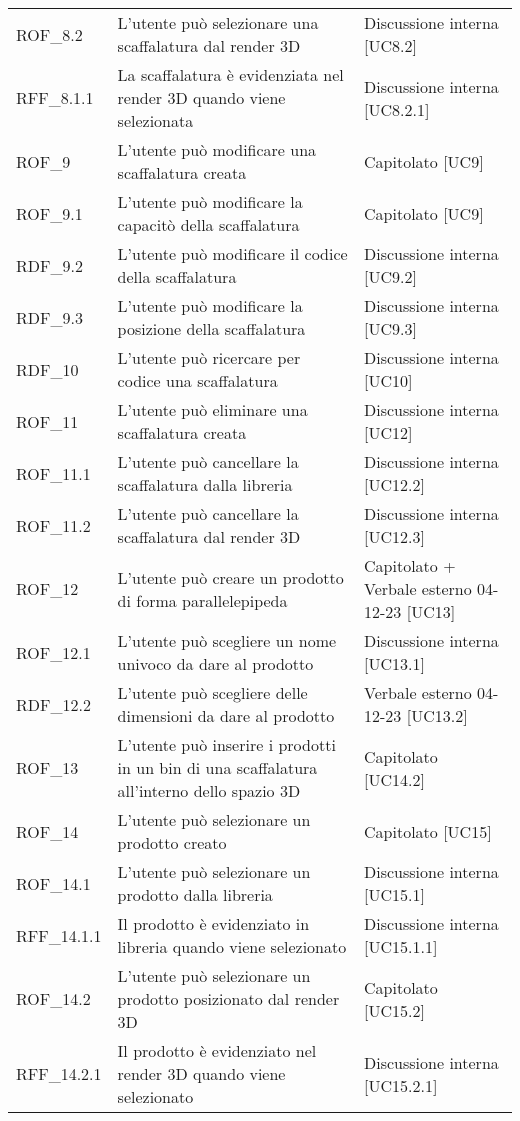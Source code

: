\begin{xltabular}{\textwidth}{ p{0.2\textwidth} | X | p{0.2\textwidth} }
    ROF\_8.2& L'utente può selezionare una scaffalatura dal render 3D & Discussione interna [UC8.2]\\
    RFF\_8.1.1& La scaffalatura è evidenziata nel render 3D quando viene selezionata & Discussione interna [UC8.2.1]\\
    ROF\_9& L'utente può modificare una scaffalatura creata & Capitolato [UC9]\\
    ROF\_9.1& L'utente può modificare la capacitò della scaffalatura & Capitolato [UC9]\\
    RDF\_9.2& L'utente può modificare il codice della scaffalatura & Discussione interna [UC9.2]\\
    RDF\_9.3& L'utente può modificare la posizione della scaffalatura & Discussione interna [UC9.3]\\
    RDF\_10& L'utente può ricercare per codice una scaffalatura & Discussione interna [UC10]\\
    ROF\_11& L'utente può eliminare una scaffalatura creata & Discussione interna [UC12]\\
    ROF\_11.1& L'utente può cancellare la scaffalatura dalla libreria & Discussione interna [UC12.2]\\
    ROF\_11.2& L'utente può cancellare la scaffalatura dal render 3D & Discussione interna [UC12.3]\\
    ROF\_12& L'utente può creare un prodotto di forma parallelepipeda & Capitolato + Verbale esterno 04-12-23 [UC13]\\
    ROF\_12.1& L'utente può scegliere un nome univoco da dare al prodotto & Discussione interna [UC13.1]\\
    RDF\_12.2& L'utente può scegliere delle dimensioni da dare al prodotto & Verbale esterno 04-12-23 [UC13.2]    \\
    ROF\_13& L'utente può inserire i prodotti in un bin di una scaffalatura all'interno dello spazio 3D & Capitolato [UC14.2]\\
    ROF\_14& L'utente può selezionare un prodotto creato & Capitolato [UC15]\\
    ROF\_14.1& L'utente può selezionare un prodotto dalla libreria & Discussione interna [UC15.1]\\
    RFF\_14.1.1& Il prodotto è evidenziato in libreria quando viene selezionato & Discussione interna [UC15.1.1]\\
    ROF\_14.2& L'utente può selezionare un prodotto posizionato dal render 3D & Capitolato [UC15.2]\\
    RFF\_14.2.1& Il prodotto è evidenziato nel render 3D quando viene selezionato & Discussione interna [UC15.2.1]\\

\end{xltabular}
